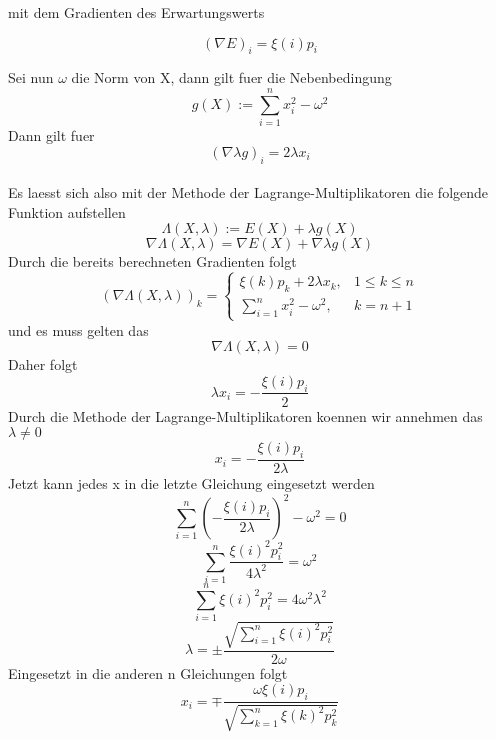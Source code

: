 \documentclass[11pt]{scrartcl}
\begin{document}
			mit dem Gradienten des Erwartungswerts
			\begin{center}
				\[(\nabla E)_{i}=\xi(i)p_{i}\]
			\end{center}
			Sei nun \(\omega\) die Norm von X, dann gilt fuer die Nebenbedingung
			\[g(X):=\sum_{i=1}^{n}x_{i}^2-{\omega}^2\]
			Dann gilt fuer \[(\nabla \lambda g)_{i} = 2\lambda x_{i}\]\\
			Es laesst sich also mit der Methode der Lagrange-Multiplikatoren die folgende Funktion aufstellen \[\Lambda(X,\lambda) := E(X)+\lambda g(X)\]
			\[\nabla \Lambda(X,\lambda) = \nabla E(X) + \nabla \lambda g(X)\]
			Durch die bereits berechneten Gradienten folgt
			\[(\nabla \Lambda (X,\lambda))_{k}=
				\begin{cases}
					\xi (k)p_{k}+2\lambda x_{k}, & 1\leq k\leq n\\
					\sum_{i=1}^{n}x_{i}^2-\omega^2, & k = n+1
				\end{cases}\]
			und es muss gelten das
			\[\nabla \Lambda(X,\lambda)=0\]
			Daher folgt
			\[\lambda x_{i} = -\frac{\xi(i)p_{i}}{2}\]
			Durch die Methode der Lagrange-Multiplikatoren koennen wir annehmen das \(\lambda \neq 0\)
			\[x_{i}= -\frac{\xi(i)p_{i}}{2\lambda}\]
			Jetzt kann jedes x in die letzte Gleichung eingesetzt werden
			\[\sum_{i=1}^{n}(-\frac{\xi(i)p_{i}}{2\lambda})^2-\omega^2=0\]
			\[\sum_{i=1}^{n}\frac{\xi(i)^2p_{i}^2}{4\lambda^2}=\omega^2\]
			\[\sum_{i=1}^{n}\xi(i)^2p_{i}^2=4\omega^2\lambda^2\]
			\[\lambda = \pm\frac{\sqrt{\sum_{i=1}^{n}\xi(i)^2p_{i}^2}}{2\omega}\]
			Eingesetzt in die anderen n Gleichungen folgt
			\[x_{i}=\mp\frac{\omega\xi(i)p_{i}}{\sqrt{\sum_{k=1}^{n}\xi(k)^2p_{k}^2}}\]

			
\end{document}
